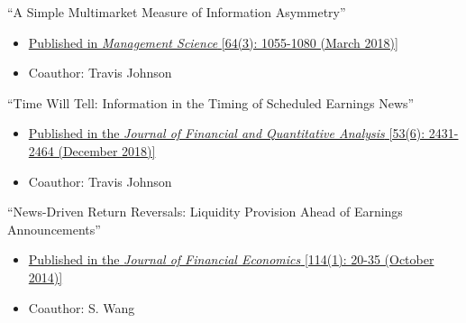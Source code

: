 \vskip 0.08cm
\pagebreak[0]
\begin{samepage}
\item ``A Simple Multimarket Measure of Information Asymmetry''
\begin{itemize}
\vspace*{-.07in}
	\item \href{https://doi.org/10.1287/mnsc.2016.2608}{Published in {\it Management Science} [64(3): 1055-1080 (March 2018)]}
\vspace*{-.07in}
	\item Coauthor: Travis Johnson
\end{itemize}
\end{samepage}



\pagebreak[0]
\begin{samepage}
\item ``Time Will Tell: Information in the Timing of Scheduled Earnings News''
\begin{itemize}
\vspace*{-.07in}
	\item \href{https://doi.org/10.1017/S0022109018000492}{Published in the {\it Journal of Financial and Quantitative Analysis} [53(6): 2431-2464 (December 2018)]}
\vspace*{-.07in}
	\item Coauthor: Travis Johnson
\end{itemize}
\end{samepage}


\vskip 0.08cm

\pagebreak[0]
\begin{samepage}
\item ``News-Driven Return Reversals: Liquidity Provision Ahead of Earnings Announcements''
\begin{itemize}
\vspace*{-.07in}
	\item \href{https://doi.org/10.1016/j.jfineco.2014.06.009}{Published in the {\it Journal of Financial Economics} [114(1): 20-35 (October 2014)]}
\vspace*{-.07in}
	\item Coauthor: S. Wang
\end{itemize}
\end{samepage}
\vskip 0.08cm


